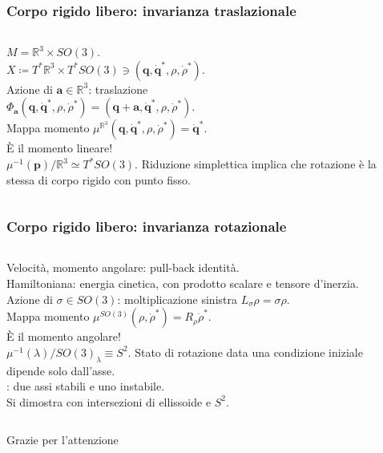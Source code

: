\documentclass[]{beamer}
\newcommand{\R}{\mathbb{R}}
\renewcommand{\vec}[1]{\boldsymbol{#1}}
\newcommand{\defeq}{\coloneq}
\let\emph\relax %
\begin{document}
\begin{frame}
\frametitle{Corpo rigido libero: invarianza traslazionale}
\begin{columns}
  $M = \R^3 \times SO(3)$.\\ $X \defeq T^* \R^3 \times T^*SO(3) \ni (\vec{q}, \vec{\dot{q}}^*, \rho, \dot{\rho}^*)$.\\[5pt]
  Azione di $\vec{a} \in \R^3$: traslazione\\ $\Phi_{\vec{a}}(\vec{q}, \vec{\dot{q}}^*, \rho, \dot{\rho}^*) = (\vec{q}+\vec{a}, \vec{\dot{q}}^*, \rho, \dot{\rho}^*)$.\\[5pt]
  Mappa momento $\mu^{\R^3}(\vec{q}, \vec{\dot{q}}^*, \rho, \dot{\rho}^*) = \vec{\dot{q}}^*$.\\ È il \alert{momento lineare}!\\[11pt]
  $\mu^{-1}(\vec{p})/\R^3 \simeq T^* SO(3)$. Riduzione simplettica implica che rotazione è la stessa di corpo rigido con punto fisso.
    \begin{center}
          
    \end{center}
\end{columns}
\end{frame}

\begin{frame}
\frametitle{Corpo rigido libero: invarianza rotazionale}
\begin{columns}
  Velocità, momento angolare: pull-back identità.\\
  Hamiltoniana: energia cinetica, con prodotto scalare e tensore d'inerzia.\\[11pt]
  Azione di $\sigma \in SO(3)$: moltiplicazione sinistra
  $L_{\sigma}\rho = \sigma \rho$. \\[5pt]
  Mappa momento $\mu^{SO(3)}(\rho, \dot{\rho}^*) = R_{\rho}\dot{\rho}^*$.\\ È il \alert{momento angolare}!\\[11pt]
  $\mu^{-1}(\lambda)/SO(3)_{\lambda} \equiv S^2$. Stato di rotazione data una condizione iniziale dipende solo dall'asse.\\[11pt]
  \emph{Poinsot}: due assi stabili e uno instabile.\\
  Si dimostra con intersezioni di ellissoide e $S^2$.
    \begin{center}
          
    \end{center}
\end{columns}
\end{frame}

\appendix
\begin{frame}[plain]
\hspace{0pt}
\vfill
\begin{center}
  \Huge Grazie per l'attenzione
\end{center}
\vfill
\hspace{0pt}
\end{frame}
\end{document}
